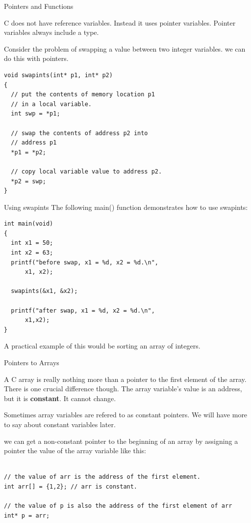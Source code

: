 \documentclass[10pt]{beamer}
\begin{document}
\begin{frame}[fragile]{Pointers and Functions}

C does not have reference variables.  Instead it uses pointer variables.  Pointer variables always include a type.  

Consider the problem of swapping a value between two integer variables.  we can do this with pointers.
\fontsize{8pt}{8pt}
\selectfont
\begin{verbatim}
void swapints(int* p1, int* p2)
{
  // put the contents of memory location p1
  // in a local variable.
  int swp = *p1;

  // swap the contents of address p2 into 
  // address p1
  *p1 = *p2;

  // copy local variable value to address p2.
  *p2 = swp;
}
\end{verbatim}

\end{frame}
\begin{frame}[fragile]{Using swapints}
The following main() function demonstrates how to use swapints:

\begin{verbatim}
int main(void)
{
  int x1 = 50;
  int x2 = 63;
  printf("before swap, x1 = %d, x2 = %d.\n",
      x1, x2);

  swapints(&x1, &x2);

  printf("after swap, x1 = %d, x2 = %d.\n",
      x1,x2);
}

\end{verbatim}

A practical example of this would be sorting an array 
of integers.

\end{frame}
\begin{frame}[fragile]{Pointers to Arrays}

A C array is really nothing more than a pointer to the first element of the array.  There is one crucial difference though.  The array variable's value is an address, but it is \textbf{constant}. It cannot change.  

Sometimes array variables are refered to as constant pointers.  We will have more to say about constant variables later.

we can get a non-constant pointer to the beginning of an array by assigning a pointer the value of the array variable like this:

\begin{verbatim}

// the value of arr is the address of the first element.
int arr[] = {1,2}; // arr is constant.  

// the value of p is also the address of the first element of arr
int* p = arr;

\end{verbatim}

\end{frame}
\end{document}
